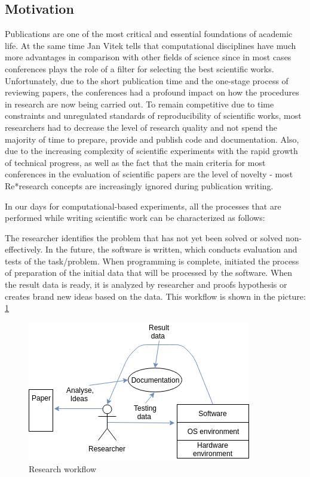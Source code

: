 \documentclass{vldb}
\begin{document}
\subsection{Motivation}
Publications are one of the most critical and essential foundations of academic life. At the same time Jan Vitek\cite{DBLP:conf/emsoft/VitekK11} tells that computational disciplines have much more advantages in comparison with other fields of science since in most cases conferences plays the role of a filter for selecting the best scientific works. Unfortunately, due to the short publication time and the one-stage process of reviewing papers, the conferences had a profound impact on how the procedures in research are now being carried out. To remain competitive due to time constraints and unregulated standards of reproducibility of scientific works, most researchers had to decrease the level of research quality and not spend the majority of time to prepare, provide and publish code and documentation. Also, due to the increasing complexity of scientific experiments with the rapid growth of technical progress, as well as the fact that the main criteria for most conferences in the evaluation of scientific papers are the level of novelty - most Re*research concepts are increasingly ignored during publication writing.\par
In our days for computational-based experiments, all the processes that are performed while writing scientific work can be characterized as follows: \par
The researcher identifies the problem that has not yet been solved or solved non-effectively. In the future, the software is written, which conducts evaluation and tests of the task/problem. When programming is complete,  initiated the process of preparation of the initial data that will be processed by the software. When the result data is ready, it is analyzed by researcher and proofs hypothesis or creates brand new ideas based on the data. This workflow is shown in the picture: \ref{fig:workflow} \par
\begin{figure}[h!]
  \includegraphics[scale=0.6]{fig/reresearch.png}
  \caption{Research workflow}
  \label{fig:workflow}
\end{figure}
\end{document}
